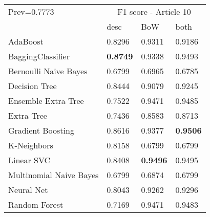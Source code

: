 \begin{tabular}{|l|l|l|l| }
\hline
Prev=0.7773 &  \multicolumn{3}{c|}{F1 score - Article 10} \\
\cline{2-4} & desc & BoW & both \\ \hline
AdaBoost                & 0.8296 & 0.9311 & 0.9186\\
BaggingClassifier       & {\bf 0.8749} & 0.9338 & 0.9493\\
Bernoulli Naive Bayes   & 0.6799 & 0.6965 & 0.6785\\
Decision Tree           & 0.8444 & 0.9079 & 0.9245\\
Ensemble Extra Tree     & 0.7522 & 0.9471 & 0.9485\\
Extra Tree              & 0.7436 & 0.8583 & 0.8713\\
Gradient Boosting       & 0.8616 & 0.9377 & {\bf 0.9506}\\
K-Neighbors             & 0.8158 & 0.6799 & 0.6799\\
Linear SVC              & 0.8408 & {\bf 0.9496} & 0.9495\\
Multinomial Naive Bayes & 0.6799 & 0.6874 & 0.6799\\
Neural Net              & 0.8043 & 0.9262 & 0.9296\\
Random Forest           & 0.7169 & 0.9471 & 0.9483\\
\hline
\end{tabular}